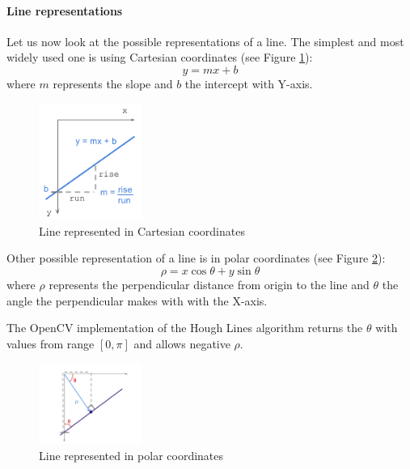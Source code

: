 \paragraph{Line representations}
Let us now look at the possible representations of a line. The simplest and most widely used one is using Cartesian coordinates (see Figure \ref{fig:line_cartesian}):
\begin{equation}
	y = m x + b
\end{equation}
where $m$ represents the slope and $b$ the intercept with Y-axis.
\begin{figure}[H]
	\centering
	\includegraphics[width=0.3\textwidth]{images/hough_cartesian_equation}
	\caption{Line represented in Cartesian coordinates}
	\label{fig:line_cartesian}
\end{figure}
Other possible representation of a line is in polar coordinates (see Figure \ref{fig:line_polar}):
\begin{equation}
	\rho = x \cos\theta + y \sin\theta
\end{equation}
where $\rho$ represents the perpendicular distance from origin to the line and $\theta$ the angle the perpendicular makes with with the X-axis.
\begin{note}
	The OpenCV implementation of the Hough Lines algorithm returns the $\theta$ with values from range $[0, \pi]$ and allows negative $\rho$.
\end{note}
\begin{figure}[H]
	\centering
	\includegraphics[width=0.3\textwidth]{images/hough_polar}
	\caption{Line represented in polar coordinates}
	\label{fig:line_polar}
\end{figure}

